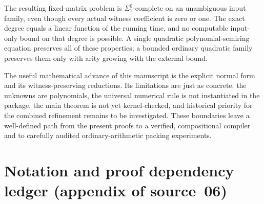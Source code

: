 \documentclass[11pt,letterpaper]{article}
\numberwithin{equation}{section}
\theoremstyle{definition}
\begin{document}
The resulting fixed-matrix problem is $\Sigma^0_1$-complete on
an unambiguous input family, even though every actual witness coefficient
is zero or one. The exact degree equals a linear function of the running
time, and no computable input-only bound on that degree is possible. A
single quadratic polynomial-semiring equation preserves all of these
properties; a bounded ordinary quadratic family preserves them only with
arity growing with the external bound.

The useful mathematical advance of this manuscript is the explicit
normal form and its witness-preserving reductions. Its limitations are
just as concrete: the unknowns are polynomials, the universal numerical
rule is not instantiated in the package, the main theorem is not yet
kernel-checked, and historical priority for the combined refinement
remains to be investigated. These boundaries leave a well-defined path
from the present proofs to a verified, compositional compiler and to
carefully audited ordinary-arithmetic packing experiments.

\clearpage
\section{Notation and proof dependency ledger (appendix of source~06)}\label{pwh:uh:app:ledger}
\end{document}
